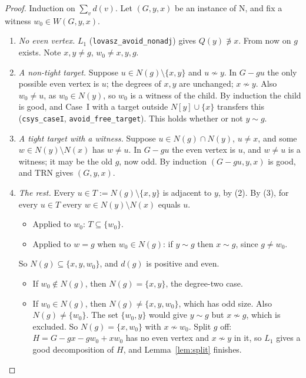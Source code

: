 \documentclass[11pt]{amsart}
\theoremstyle{definition}
\newcommand{\TRN}{\mathrm{TRN}}
\begin{document}
\begin{proof}
Induction on $\sum_vd(v)$. Let $(G,y,x)$ be an instance of N, and fix a witness $w_0\in W(G,y,x)$.
\begin{enumerate}[label=(\arabic*)]
\item \emph{No even vertex.} $L_1$ (\texttt{lovasz\_avoid\_nonadj}) gives $Q(y)\not\ni x$. From now
on $g$ exists. Note $x,y\ne g$, $w_0\ne x,y,g$.
\item \emph{A non-tight target.} Suppose $u\in N(g)\setminus\{x,y\}$ and $u\not\sim y$. In $G-gu$
the only possible even vertex is $u$; the degrees of $x,y$ are unchanged; $x\not\sim y$. Also
$w_0\ne u$, as $w_0\in N(y)$, so $w_0$ is a witness of the child. By induction the child is good,
and Case~I with a target outside $N[y]\cup\{x\}$ transfers this (\texttt{csys\_caseI},
\texttt{avoid\_free\_target}). This holds whether or not $y\sim g$.
\item \emph{A tight target with a witness.} Suppose $u\in N(g)\cap N(y)$, $u\ne x$, and some $w\in
N(y)\setminus N(x)$ has $w\ne u$. In $G-gu$ the even vertex is $u$, and $w\ne u$ is a witness; it
may be the old $g$, now odd. By induction $(G-gu,y,x)$ is good, and $\TRN$ gives $(G,y,x)$.
\item \emph{The rest.} Every $u\in T:=N(g)\setminus\{x,y\}$ is adjacent to $y$, by (2). By (3), for
every $u\in T$ every $w\in N(y)\setminus N(x)$ equals $u$.
  \begin{itemize}
  \item Applied to $w_0$: $T\subseteq\{w_0\}$.
  \item Applied to $w=g$ when $w_0\in N(g)$: if $y\sim g$ then $x\sim g$, since $g\ne w_0$.
  \end{itemize}
  So $N(g)\subseteq\{x,y,w_0\}$, and $d(g)$ is positive and even.
  \begin{itemize}
  \item If $w_0\notin N(g)$, then $N(g)=\{x,y\}$, the degree-two case.
  \item If $w_0\in N(g)$, then $N(g)\ne\{x,y,w_0\}$, which has odd size. Also $N(g)\ne\{w_0\}$.
  The set $\{w_0,y\}$ would give $y\sim g$ but $x\not\sim g$, which is excluded. So
  $N(g)=\{x,w_0\}$ with $x\not\sim w_0$. Split $g$ off: $H=G-gx-gw_0+xw_0$ has no even vertex and
  $x\not\sim y$ in it, so $L_1$ gives a good decomposition of $H$, and Lemma~\ref{lem:split}
  finishes.\qedhere
  \end{itemize}
\end{enumerate}
\end{proof}
\end{document}
